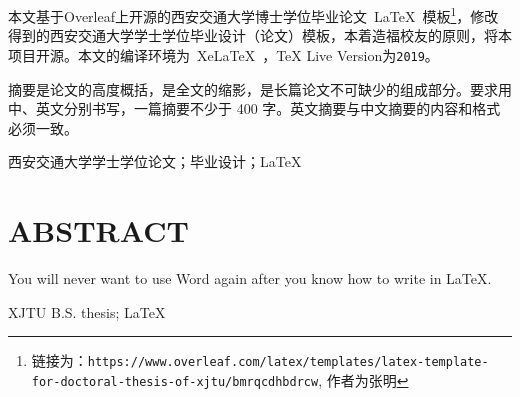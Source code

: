 
\clearpage
\titlespacing{\chapter}{0pt}{0mm}{5mm}



本文基于Overleaf上开源的西安交通大学博士学位毕业论文~\LaTeX~模板\footnote{链接为：\texttt{https://www.overleaf.com/latex/templates/latex-template-for-doctoral-thesis-of-xjtu/bmrqcdhbdrcw}, 作者为张明}，修改得到的西安交通大学学士学位毕业设计（论文）模板，本着造福校友的原则，将本项目开源。{\color{red}本文的编译环境为~XeLaTeX~，TeX Live Version为\texttt{2019}}。

摘要是论文的高度概括，是全文的缩影，是长篇论文不可缺少的组成部分。要求用中、英文分别书写，一篇摘要不少于 400 字。英文摘要与中文摘要的内容和格式必须一致。

\vspace{\baselineskip}
 西安交通大学学士学位论文；毕业设计；\LaTeX


\clearpage
{}

\titlespacing{\chapter}{0pt}{0mm}{5mm}
\chapter*{ABSTRACT}

\noindent You will never want to use Word again after you know how to write in \LaTeX.

\vspace{\baselineskip}
 XJTU B.S. thesis; \LaTeX


\titlespacing{\chapter}{0pt}{-6mm}{5mm}
\clearpage{\pagestyle{empty}\cleardoublepage}
